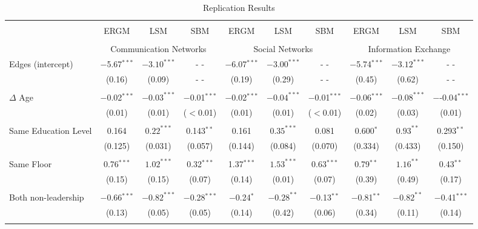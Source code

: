 \documentclass[fleqn,12pt]{wlscirep}
\begin{document}
\begin{landscape}
\begin{table}[!htbp] \centering
\caption{Replication Results}
\label{table:coefficients}
\begin{tabular}{lccccccccc}
\\[-1.8ex]\hline
\hline \\[-1.8ex]
 & ERGM & LSM & SBM  & ERGM & LSM & SBM & ERGM & LSM & SBM\\
\hline \\[-1.8ex]
 &  \multicolumn{3}{c}{Communication Networks} &  
 \multicolumn{3}{c}{Social Networks}&  
 \multicolumn{3}{c}{Information Exchange}\\
\hline
Edges (intercept)   & $-$5.67$^{***}$ &$-3.10^{***}$ & - - & 
$-$6.07$^{***}$ &$-3.00^{***}$& - - & 
$-$5.74$^{***}$ &   $-3.12^{***}$  & - -  
\\ 
& (0.16) & (0.09) & - - &(0.19) & (0.29) &  - - &(0.45) & (0.62)& - -
 \\ 
  & & & \\ 
$\Delta$ Age & $-$0.02$^{***}$ & $-0.03^{***}$  & $-$0.01$^{***}$ &
$-$0.02$^{***}$ & $-0.04^{***}$    &$-$0.01$^{***}$ &
 $-$0.06$^{***}$ & $-0.08^{***}$  &   $-$-0.04$^{***}$ \\
  & (0.01)   & (0.01) & ($<$0.01) &
  (0.01) & (0.01) &  ($<$0.01) &
  (0.02)& (0.03)  &(0.01)\\ 
  & & & \\ 
Same Education Level & 0.164 & $0.22^{***}$ & 0.143$^{**}$&
0.161 & $0.35^{***}$ & 0.081 &
0.600$^{*}$ &  $0.93^{**}$ & 0.293$^{**}$ \\ 
  & (0.125) &(0.031) & (0.057) &
  (0.144) & (0.084) &  (0.070) &
  (0.334) &(0.433)&(0.150)\\ 
  & & & \\ 
Same Floor & 0.76$^{***}$ & $1.02^{***}$  & 0.32$^{***}$ & 
1.37$^{***}$      & $1.53^{***}$   &   0.63$^{***}$   &
0.79$^{**}$ & $1.16^{**}$  & 0.43$^{**}$ \\ 
  & (0.15)  & (0.15) & (0.07) &
  (0.14) & (0.01) &  (0.07) & 
  (0.39)& (0.49) &(0.17) \\ 
  & & & \\ 
Both non-leadership & $-$0.66$^{***}$ &   $-0.82^{***}$   & $-$0.28$^{***}$ &           
$-$0.24$^{*}$ &$-0.28^{**}$& $-$0.13$^{**}$& 
$-$0.81$^{**}$ & $-0.82^{**}$  & $-$0.41$^{***}$\\
  & (0.13) & (0.05) & (0.05) & (0.14) &  (0.42) & (0.06)&(0.34)   & (0.11)& (0.14)\\ 
  & & & \\ 

\end{tabular}
\end{table}
\end{landscape}
\end{document}
